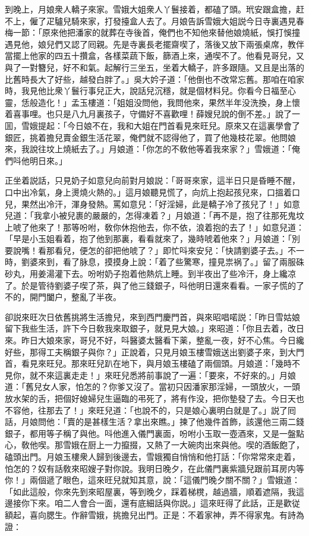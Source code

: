 到晚上，月娘衆人轎子來家。雪娥大姐衆人丫鬟接着，都磕了頭。玳安跟盒擔，赶不上，僱了疋驢兒騎來家，打發擡盒人去了。月娘告訴雪娥大姐説今日寺裏遇見春梅一節：「原來他把潘家的就葬在寺後首，俺們也不知他來替他娘燒紙，悞打悞撞遇見他，娘兒們又認了囘親。先是寺裏長老擺齋喫了，落後又放下兩張桌席，教伴當擺上他家的四五十攢盒，各樣菜蔬下飯，篩酒上來，通喫不了。他看見哥兒，又與了一對簪兒，好不和氣。起解行三坐五，坐着大轎子，許多跟隨。又且是出落的比舊時長大了好些，越發白胖了。」吳大妗子道：「他倒也不改常忘舊。那咱在咱家時，我見他比衆丫鬟行事兒正大，說話兒沉穩，就是個材料兒。你看今日福至心靈，恁般造化！」孟玉樓道：「姐姐没問他，我問他來，果然半年没洗換，身上懷着喜事哩。也只是八九月裏孩子，守備好不喜歡哩！薛嫂兒說的倒不差。」說了一囬，雪娥提起：「今日娘不在，我和大姐在門首看見來旺兒。原來又在這裏學會了銀匠，挑着擔兒賣金銀生活花翠，俺們就不認得他了，買了他幾枝花翠。他問娘來，我說往坟上燒紙去了。」月娘道：「你怎的不敎他等着我來家？」雪娥道：「俺們呌他明日來。」

正坐着説話，只見奶子如意兒向前對月娘説：「哥哥來家，這半日只是昏睡不醒，口中出冷氣，身上燙燒火熱的。」這月娘聽見慌了，向炕上抱起孩兒來，口搵着口兒，果然出冷汗，渾身發熱。罵如意兒：「好淫婦，此是轎子冷了孩兒了！」如意兒道：「我拿小被兒裹的嚴嚴的，怎得凍着？」月娘道：「再不是，抱了往那死鬼坟上唬了他來了！那等吩咐，敎你休抱他去，你不依，浪着抱的去了！」如意兒道：「早是小玉姐看着，抱了他到那裏，看看就來了，幾時唬着他來？」月娘道：「別要說嘴！看那看兒，便怎的卻把他唬了？」即忙呌來安兒：「快請劉婆子去。」不一時，劉婆來到，看了脉息，摸摸身上說：「着了些驚寒，撞見祟祸了。」留了兩服硃砂丸，用姜湯灌下去。吩咐奶子抱着他熱炕上睡。到半夜出了些冷汗，身上纔凉了。於是管待劉婆子喫了茶，與了他三錢銀子，呌他明日還來看看。一家子慌的了不的，開門闔户，整亂了半夜。

卻説來旺次日依舊挑將生活擔兒，來到西門慶門首，與來昭唱喏説：「昨日雪姑娘留下我些生活，許下今日敎我來取銀子，就見見大娘。」來昭道：「你且去着，改日來。昨日大娘來家，哥兒不好，呌醫婆太醫看下薬，整亂一夜，好不心焦。今日纔好些，那得工夫稱銀子與你？」正說着，只見月娘玉樓雪娥送出劉婆子來，到大門首，看見來旺兒。那來旺兒趴在地下，與月娘玉樓磕了兩個頭。月娘道：「幾時不見你，就不來這裏走走！」來旺兒悉將前事說了一遍：「要來，不好來的。」月娘道：「舊兒女人家，怕怎的？你爹又沒了。當初只因潘家那淫婦，一頭放火，一頭放水架的舌，把個好媳婦兒生逼臨的弔死了，將有作没，把你墊發了去。今日天也不容他，往那去了！」來旺兒道：「也說不的，只是娘心裏明白就是了。」説了囘話，月娘問他：「賣的是甚樣生活？拿出來瞧。」揀了他幾件首飾，該還他三兩二錢銀子，都用等子稱了與他。呌他進入儀門裏面，吩咐小玉取一壺酒來，又是一盤點心，敎他喫。那雪娥在厨上一力攛掇，又熱了一大碗肉出來與他。喫的酒飯飽了，磕頭出門。月娘玉樓衆人歸到後邊去，雪娥獨自悄悄和他打話：「你常常來走着，怕怎的？奴有話敎來昭嫂子對你說。我明日晚夕，在此儀門裏紫牆兒跟前耳房内等你！」兩個遞了眼色，這來旺兒就知其意，說：「這儀門晚夕關不關？」雪娥道：「如此這般，你來先到來昭屋裏，等到晚夕，踩着梯櫈，越過牆，順着遮隔，我這邊接你下來。咱二人會合一面，還有底細話與你説。」這來旺得了此話，正是歡従額起，喜向腮生。作辭雪娥，挑擔兒出門。正是：不着家神，弄不得家鬼。有詩為證：

